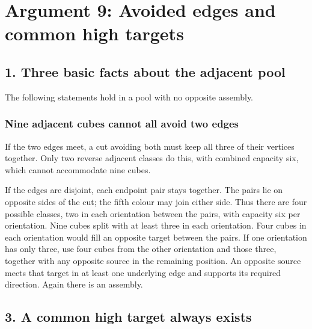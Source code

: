 \documentclass[
  10pt,
]{article}
\begin{document}
\hypertarget{arg-9}{%
\section{Argument 9: Avoided edges and common high
targets}\label{arg-9}}

\hypertarget{three-basic-facts-about-the-adjacent-pool}{%
\subsection*{1. Three basic facts about the adjacent
pool}\label{three-basic-facts-about-the-adjacent-pool}}

The following statements hold in a pool with no opposite assembly.

\hypertarget{nine-adjacent-cubes-cannot-all-avoid-two-edges}{%
\subsubsection*{Nine adjacent cubes cannot all avoid two
edges}\label{nine-adjacent-cubes-cannot-all-avoid-two-edges}}

If the two edges meet, a cut avoiding both must keep all three of their
vertices together. Only two reverse adjacent classes do this, with
combined capacity six, which cannot accommodate nine cubes.

If the edges are disjoint, each endpoint pair stays together. The pairs
lie on opposite sides of the cut; the fifth colour may join either side.
Thus there are four possible classes, two in each orientation between
the pairs, with capacity six per orientation. Nine cubes split with at
least three in each orientation. Four cubes in each orientation would
fill an opposite target between the pairs. If one orientation has only
three, use four cubes from the other orientation and those three,
together with any opposite source in the remaining position. An opposite
source meets that target in at least one underlying edge and supports
its required direction. Again there is an assembly.

\hypertarget{a-common-high-target-always-exists}{%
\subsection*{3. A common high target always
exists}\label{a-common-high-target-always-exists}}
\end{document}
